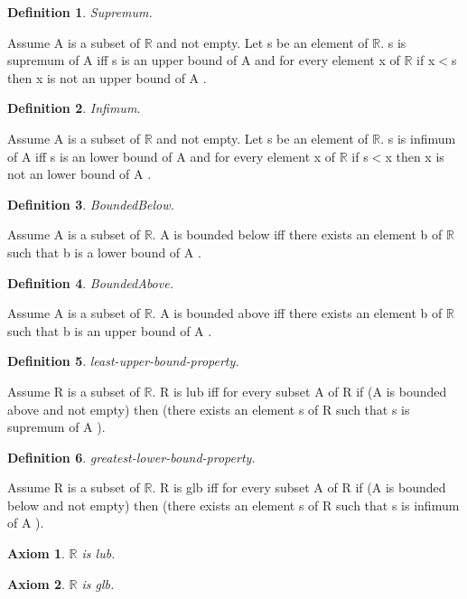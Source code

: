 \documentclass{article}
\newenvironment{forthel}{\begin{leftbar}}{\end{leftbar}}
\newtheorem{axiom}{Axiom}
\newtheorem{definition}{Definition}
\begin{document}
\begin{forthel}
\begin{definition} Supremum.

\end{definition}
Assume A is a subset of $\mathbb{R}$ and not empty.
Let s be an element of $\mathbb{R}$.
s is supremum of A  iff s is an upper bound of A 
and for every element x of $\mathbb{R}$ if x$<$s then x is not an upper bound of A .

\begin{definition} Infimum.

\end{definition}
Assume A is a subset of $\mathbb{R}$ and not empty.
Let s be an element of $\mathbb{R}$.
s is infimum of A  iff s is an lower bound of A 
and for every element x of $\mathbb{R}$ if s$<$x then x is not an lower bound of A .

\begin{definition} BoundedBelow.

\end{definition}
Assume A is a subset of $\mathbb{R}$.
A is bounded below  iff 
there exists an element b of $\mathbb{R}$ such that b is a lower bound of A .

\begin{definition} BoundedAbove.

\end{definition}
Assume A is a subset of $\mathbb{R}$.
A is bounded above  iff 
there exists an element b of $\mathbb{R}$ such that b is an upper bound of A .

\begin{definition} least-upper-bound-property.

\end{definition}
Assume R is a subset of $\mathbb{R}$.
R is lub iff for every subset A of R
if (A is bounded above and not empty) then (there exists an element s of R such that s is supremum of A ).

\begin{definition} greatest-lower-bound-property.

\end{definition}
Assume R is a subset of $\mathbb{R}$.
R is glb iff for every subset A of R
if (A is bounded below and not empty) then (there exists an element s of R such that s is infimum of A ).

\begin{axiom} $\mathbb{R}$ is lub.

\end{axiom}
\begin{axiom} $\mathbb{R}$ is glb.


\end{axiom}
\end{forthel}
\end{document}
